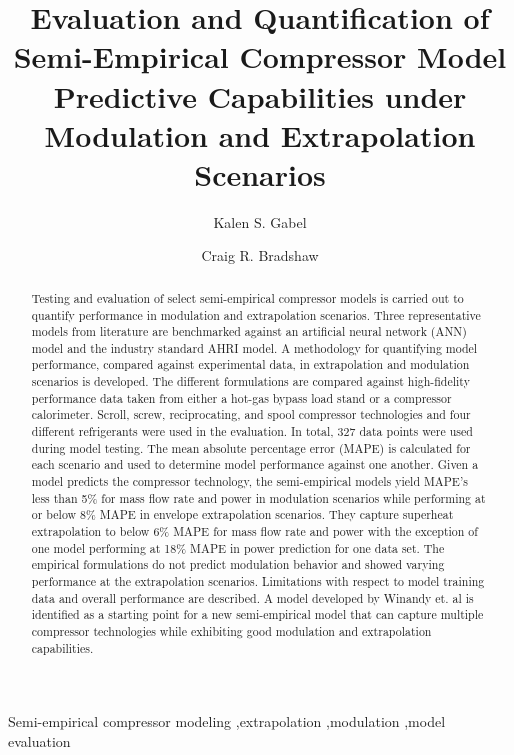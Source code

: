 \documentclass[preprint,11pt,authoryear]{elsarticle}
\begin{document}

\begin{frontmatter}

\title{Evaluation and Quantification of Semi-Empirical Compressor Model Predictive Capabilities under Modulation and Extrapolation Scenarios}

\author[1]{Kalen S. Gabel
}
\author[1]{Craig R. Bradshaw}
\address[1]{Center for Integrated Building Systems, Oklahoma State University, Stillwater, OK 74078}
\begin{abstract}

Testing and evaluation of select semi-empirical compressor models is carried out to quantify performance in modulation and extrapolation scenarios. Three representative models from literature are benchmarked against an artificial neural network (ANN) model and the industry standard AHRI model. A methodology for quantifying model performance, compared against experimental data, in extrapolation and modulation scenarios is developed. The different formulations are compared against high-fidelity performance data taken from either a hot-gas bypass load stand or a compressor calorimeter. Scroll, screw, reciprocating, and spool compressor technologies and four different refrigerants were used in the evaluation. In total, 327 data points were used during model testing. The mean absolute percentage error (MAPE) is calculated for each scenario and used to determine model performance against one another. Given a model predicts the compressor technology, the semi-empirical models yield MAPE’s less than 5\% for mass flow rate and power in modulation scenarios while performing at or below 8\% MAPE in envelope extrapolation scenarios. They capture superheat extrapolation to below 6\% MAPE for mass flow rate and power with the exception of one model performing at 18\% MAPE in power prediction for one data set. The empirical formulations do not predict modulation behavior and showed varying performance at the extrapolation scenarios. Limitations with respect to model training data and overall performance are described. A model developed by Winandy et. al is identified as a starting point for a new semi-empirical model that can capture multiple compressor technologies while exhibiting good modulation and extrapolation capabilities.

\end{abstract}

\begin{keyword}
Semi-empirical compressor modeling \sep extrapolation \sep modulation \sep model evaluation
\end{keyword}

\end{frontmatter}
\end{document}
